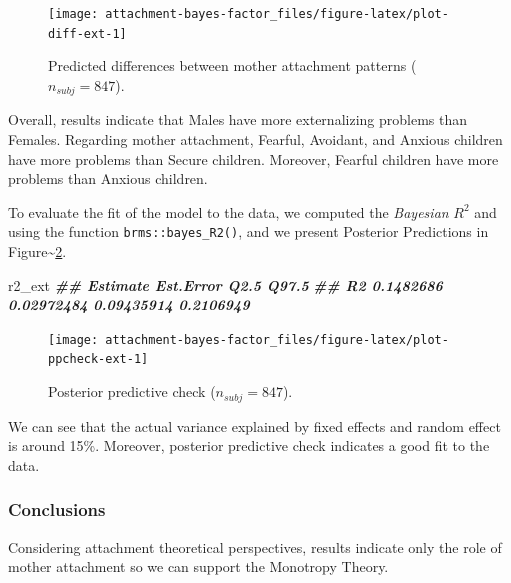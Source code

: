 \documentclass[
]{book}
\newenvironment{Shaded}{\begin{snugshade}}{\end{snugshade}}
\newcommand{\DocumentationTok}[1]{\textcolor[rgb]{0.56,0.35,0.01}{\textbf{\textit{#1}}}}
\newcommand{\NormalTok}[1]{#1}
\begin{document}
\begin{figure}

{\centering \texttt{[image: attachment-bayes-factor\_files/figure-latex/plot-diff-ext-1]} 

}

\caption{Predicted differences between mother attachment patterns ($n_{subj} = 847$).}\label{fig:plot-diff-ext}
\end{figure}

Overall, results indicate that Males have more externalizing problems than Females. Regarding mother attachment, Fearful, Avoidant, and Anxious children have more problems than Secure children. Moreover, Fearful children have more problems than Anxious children.

To evaluate the fit of the model to the data, we computed the \emph{Bayesian} \(R^2\) and using the function \texttt{brms::bayes\_R2()}, and we present Posterior Predictions in Figure\textasciitilde\ref{fig:plot-ppcheck-ext}.

\begin{Shaded}
\begin{Highlighting}[]
\NormalTok{r2\_ext}
\DocumentationTok{\#\#     Estimate  Est.Error       Q2.5     Q97.5}
\DocumentationTok{\#\# R2 0.1482686 0.02972484 0.09435914 0.2106949}
\end{Highlighting}
\end{Shaded}

\begin{figure}

{\centering \texttt{[image: attachment-bayes-factor\_files/figure-latex/plot-ppcheck-ext-1]} 

}

\caption{Posterior predictive check ($n_{subj} = 847$).}\label{fig:plot-ppcheck-ext}
\end{figure}

We can see that the actual variance explained by fixed effects and random effect is around 15\%. Moreover, posterior predictive check indicates a good fit to the data.

\hypertarget{conclusions-2}{%
\subsubsection*{Conclusions}\label{conclusions-2}}

Considering attachment theoretical perspectives, results indicate only the role of mother attachment so we can support the Monotropy Theory.
\end{document}
